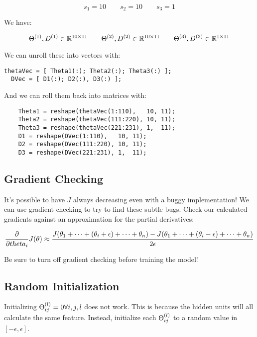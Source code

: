 \[
    s_1 = 10 \qquad 
    s_2 = 10 \qquad 
    s_3 = 1
\]

We have:

\[
    \Theta\s{1}, D\s{1} \in \R^{10 \times 11} \qquad
    \Theta\s{2}, D\s{2} \in \R^{10 \times 11} \qquad
    \Theta\s{3}, D\s{3} \in \R^{1 \times 11}
\]

We can unroll these into vectors with:

\begin{lstlisting}[style=Matlab-editor]
  thetaVec = [ Theta1(:); Theta2(:); Theta3(:) ];
  DVec = [ D1(:); D2(:), D3(:) ];
\end{lstlisting}

And we can roll them back into matrices with:

\begin{lstlisting}[style=Matlab-editor]
    % Note: the indices are inclusive
    Theta1 = reshape(thetaVec(1:110),   10, 11);
    Theta2 = reshape(thetaVec(111:220), 10, 11);
    Theta3 = reshape(thetaVec(221:231), 1,  11);
    D1 = reshape(DVec(1:110),   10, 11);
    D2 = reshape(DVec(111:220), 10, 11);
    D3 = reshape(DVec(221:231), 1,  11);
\end{lstlisting}

\subsection{Gradient Checking}

It's possible to have $J$ always decreasing even with a buggy implementation!
We can use gradient checking to try to find these subtle bugs.
Check our calculated gradients against an approximation for the partial derivatives:

\[
    \pdv{theta_i} J(\theta) \approx 
    \frac{
        J(\theta_1 + \dots + (\theta_i + \epsilon) + \dots + \theta_n) 
        - J(\theta_1 + \dots + (\theta_i - \epsilon) + \dots + \theta_n)
    }{2\epsilon}
\]

Be sure to turn off gradient checking before training the model!

\subsection{Random Initialization}

Initializing $\Theta\ss{ij}{l} = 0 \forall i, j, l$ does not work.
This is because the hidden units will all calculate the same feature.
Instead, initialize each $\Theta\ss{ij}{l}$
to a random value in $[-\epsilon, \epsilon]$.

